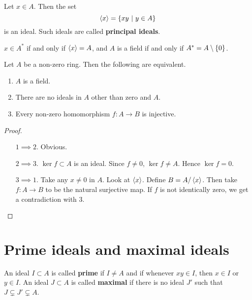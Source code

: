 \begin{definition}
Let $ x \in A $. Then the set
$$ \abr{x} = \cbr{xy \st y \in A} $$
is an ideal. Such ideals are called \textbf{principal ideals}.
\end{definition}

\begin{remark*}
$ x \in A^* $ if and only if $ \left\langle x \right\rangle = A $, and $ A $ is a field if and only if $ A^* = A \setminus \cbr{0} $.
\end{remark*}

\begin{proposition}
Let $ A $ be a non-zero ring. Then the following are equivalent.
\begin{enumerate}
\item $ A $ is a field.
\item There are no ideals in $ A $ other than zero and $ A $.
\item Every non-zero homomorphism $ f : A \to B $ is injective.
\end{enumerate}
\end{proposition}

\begin{proof}
\hfill
\begin{itemize}[leftmargin=0.5in]
\item[$ 1 \implies 2 $.] Obvious.
\item[$ 2 \implies 3 $.] $ \ker f \subset A $ is an ideal. Since $ f \ne 0 $, $ \ker f \ne A $. Hence $ \ker f = 0 $.
\item[$ 3 \implies 1 $.] Take any $ x \ne 0 $ in $ A $. Look at $ \left\langle x \right\rangle $. Define $ B = A / \left\langle x \right\rangle $. Then take $ f : A \to B $ to be the natural surjective map. If $ f $ is not identically zero, we get a contradiction with $ 3 $.
\end{itemize}
\end{proof}

\pagebreak

\section{Prime ideals and maximal ideals}

\begin{definition}
An ideal $ I \subset A $ is called \textbf{prime} if $ I \ne A $ and if whenever $ xy \in I $, then $ x \in I $ or $ y \in I $. An ideal $ J \subset A $ is called \textbf{maximal} if there is no ideal $ J' $ such that $ J \subsetneq J' \subsetneq A $.
\end{definition}

